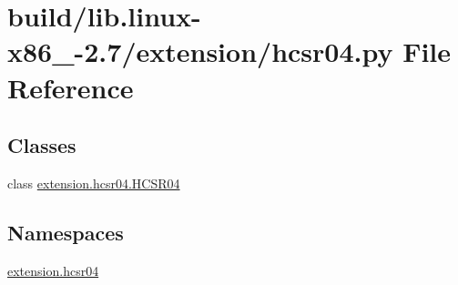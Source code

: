 \hypertarget{build_2lib_8linux-x86__64-2_87_2extension_2hcsr04_8py}{}\section{build/lib.linux-\/x86\+\_-\/2.7/extension/hcsr04.py File Reference}
\label{build_2lib_8linux-x86__64-2_87_2extension_2hcsr04_8py}
\subsection*{Classes}
\begin{DoxyCompactItemize}
\item 
class \hyperlink{classextension_1_1hcsr04_1_1HCSR04}{extension.\+hcsr04.\+H\+C\+S\+R04}
\end{DoxyCompactItemize}
\subsection*{Namespaces}
\begin{DoxyCompactItemize}
\item 
 \hyperlink{namespaceextension_1_1hcsr04}{extension.\+hcsr04}
\end{DoxyCompactItemize}
